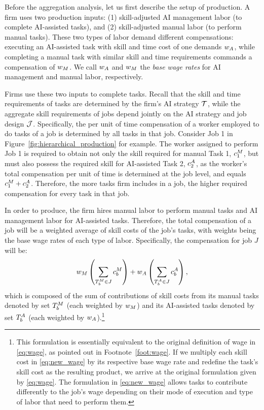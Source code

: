 Before the aggregation analysis, let us first describe the setup of production.
A firm uses two production inputs: (1) skill-adjusted AI management labor (to complete AI-assisted tasks), and (2) skill-adjusted manual labor (to perform manual tasks).
These two types of labor demand different compensations: executing an AI-assisted task with skill and time cost of one demands $w_{A}$, while completing a manual task with similar skill and time requirements commands a compensation of $w_{M}$.
We call $w_{A}$ and $w_{M}$ the \emph{base wage rates} for AI management and manual labor, respectively.

Firms use these two inputs to complete tasks.
Recall that the skill and time requirements of tasks are determined by the firm's AI strategy $\mathcal{T}$, while the aggregate skill requirements of jobs depend jointly on the AI strategy and job design $\mathcal{J}$.
Specifically, the per unit of time compensation of a worker employed to do tasks of a job is determined by all tasks in that job.
Consider Job 1 in Figure~\ref{fig:hierarchical_production} for example.
The worker assigned to perform Job 1 is required to obtain not only the skill required for manual Task 1, $c^{M}_{1}$, but must also possess the required skill for AI-assisted Task 2, $c^{A}_{2}$, as the worker's total compensation per unit of time is determined at the job level, and equals $c^{M}_{1} + c^{A}_{2}$.
Therefore, the more tasks firm includes in a job, the higher required compensation for every task in that job.

In order to produce, the firm hires manual labor to perform manual tasks and AI management labor for AI-assisted tasks.
Therefore, the total compensation of a job will be a weighted average of skill costs of the job's tasks, with weights being the base wage rates of each type of labor.
Specifically, the compensation for job $J$ will be:
\begin{equation}
w_{M} \left(\sum_{T_b^{M} \in J} c^{M}_{b}\right) + w_{A} \left(\sum_{T_b^{A} \in J} c^{A}_{b}\right),\label{eq:new_wage}
\end{equation}
which is composed of the sum of contributions of skill costs from its manual tasks denoted by set $T_b^{M}$ (each weighted by $w_{M}$) and its AI-assisted tasks denoted by set $T_b^{A}$ (each weighted by $w_{A}$).\footnote{
This formulation is essentially equivalent to the original definition of wage in \eqref{eq:wage}, as pointed out in Footnote~\ref{foot:wage}. 
If we multiply each skill cost in \eqref{eq:new_wage} by its respective base wage rate and redefine the task's skill cost as the resulting product, we arrive at the original formulation given by \eqref{eq:wage}.
The formulation in \eqref{eq:new_wage} allows tasks to contribute differently to the job's wage depending on their mode of execution and type of labor that need to perform them.}

